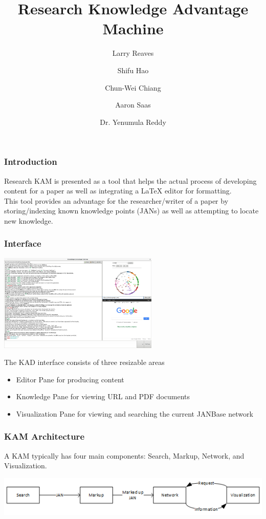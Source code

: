 \documentclass{beamer}
\begin{document}
  \title{Research Knowledge Advantage Machine}
  \author{Larry Reaves\and Shifu Hao\and Chun-Wei Chiang\and Aaron Saas\and Dr. Yenumula Reddy}
  \frame{\titlepage}
  \begin{frame}
    \frametitle{Introduction}
    Research KAM is presented as a tool that helps the actual process of developing content for a paper as well as integrating a LaTeX editor for formatting.\\
    \medskip
    This tool provides an advantage for the researcher/writer of a paper by storing/indexing known knowledge points (JANs) as well as
    attempting to locate new knowledge.
  \end{frame}
  \begin{frame}
    \frametitle{Interface}
    \begin{centering}
    \includegraphics[width=3in]{kad-overview}\\
    \end{centering}
    The KAD interface consists of three resizable areas\\
    \begin{itemize}
    \item{Editor Pane for producing content}
    \item{Knowledge Pane for viewing URL and PDF documents}
    \item{Visualization Pane for viewing and searching the current JANBase network}
    \end{itemize}
  \end{frame}
  \begin{frame}
    \frametitle{KAM Architecture}
    A KAM typically has four main components:  Search, Markup, Network, and Visualization.\\
    \medskip
    \begin{centering}
    \includegraphics[width=\linewidth]{KAM}
    \end{centering}
  \end{frame}
\end{document}
